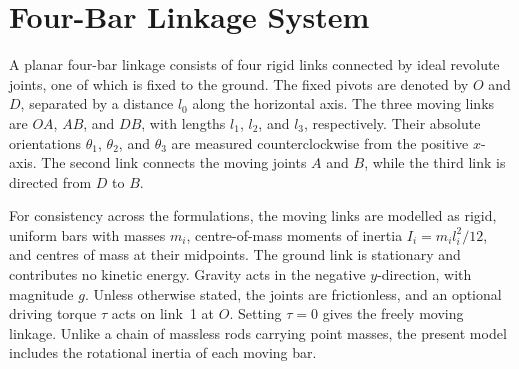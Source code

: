 \section{Four-Bar Linkage System}
\label{sec:four_bar}

A planar four-bar linkage consists of four rigid links connected by ideal revolute joints, one of which is fixed to the ground. The fixed pivots are denoted by $O$ and $D$, separated by a distance $l_0$ along the horizontal axis. The three moving links are $OA$, $AB$, and $DB$, with lengths $l_1$, $l_2$, and $l_3$, respectively. Their absolute orientations $\theta_1$, $\theta_2$, and $\theta_3$ are measured counterclockwise from the positive $x$-axis. The second link connects the moving joints $A$ and $B$, while the third link is directed from $D$ to $B$.

For consistency across the formulations, the moving links are modelled as rigid, uniform bars with masses $m_i$, centre-of-mass moments of inertia $I_i=m_i l_i^2/12$, and centres of mass at their midpoints. The ground link is stationary and contributes no kinetic energy. Gravity acts in the negative $y$-direction, with magnitude $g$. Unless otherwise stated, the joints are frictionless, and an optional driving torque $\tau$ acts on link~1 at $O$. Setting $\tau=0$ gives the freely moving linkage. Unlike a chain of massless rods carrying point masses, the present model includes the rotational inertia of each moving bar.

